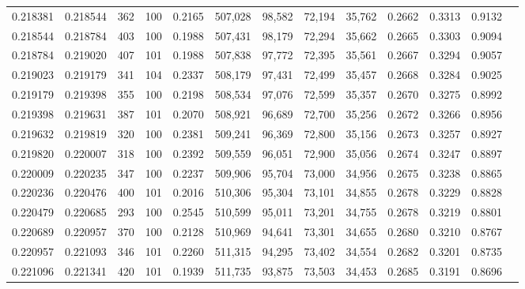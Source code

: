 \begin{tabular}{rrrrrrrrrrrrr}
0.218381 & 0.218544 &   362 & 100 &                                     0.2165 & 507,028 &  98,582 &  72,194 &  35,762 & 0.2662 & 0.3313 & 0.9132 \\
0.218544 & 0.218784 &   403 & 100 &                                     0.1988 & 507,431 &  98,179 &  72,294 &  35,662 & 0.2665 & 0.3303 & 0.9094 \\
0.218784 & 0.219020 &   407 & 101 &                                     0.1988 & 507,838 &  97,772 &  72,395 &  35,561 & 0.2667 & 0.3294 & 0.9057 \\
0.219023 & 0.219179 &   341 & 104 &                                     0.2337 & 508,179 &  97,431 &  72,499 &  35,457 & 0.2668 & 0.3284 & 0.9025 \\
0.219179 & 0.219398 &   355 & 100 &                                     0.2198 & 508,534 &  97,076 &  72,599 &  35,357 & 0.2670 & 0.3275 & 0.8992 \\
0.219398 & 0.219631 &   387 & 101 &                                     0.2070 & 508,921 &  96,689 &  72,700 &  35,256 & 0.2672 & 0.3266 & 0.8956 \\
0.219632 & 0.219819 &   320 & 100 &                                     0.2381 & 509,241 &  96,369 &  72,800 &  35,156 & 0.2673 & 0.3257 & 0.8927 \\
0.219820 & 0.220007 &   318 & 100 &                                     0.2392 & 509,559 &  96,051 &  72,900 &  35,056 & 0.2674 & 0.3247 & 0.8897 \\
0.220009 & 0.220235 &   347 & 100 &                                     0.2237 & 509,906 &  95,704 &  73,000 &  34,956 & 0.2675 & 0.3238 & 0.8865 \\
0.220236 & 0.220476 &   400 & 101 &                                     0.2016 & 510,306 &  95,304 &  73,101 &  34,855 & 0.2678 & 0.3229 & 0.8828 \\
0.220479 & 0.220685 &   293 & 100 &                                     0.2545 & 510,599 &  95,011 &  73,201 &  34,755 & 0.2678 & 0.3219 & 0.8801 \\
0.220689 & 0.220957 &   370 & 100 &                                     0.2128 & 510,969 &  94,641 &  73,301 &  34,655 & 0.2680 & 0.3210 & 0.8767 \\
0.220957 & 0.221093 &   346 & 101 &                                     0.2260 & 511,315 &  94,295 &  73,402 &  34,554 & 0.2682 & 0.3201 & 0.8735 \\
0.221096 & 0.221341 &   420 & 101 &                                     0.1939 & 511,735 &  93,875 &  73,503 &  34,453 & 0.2685 & 0.3191 & 0.8696 \\

\end{tabular}
